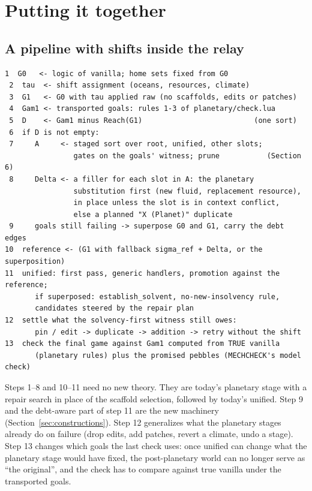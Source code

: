 \section{Putting it together}\label{sec:pipeline}

\subsection{A pipeline with shifts inside the relay}

\par\smallskip\noindent\begin{minipage}{\linewidth}
\begin{Verbatim}[fontsize=\small, frame=single, framesep=3mm]
 1  G0   <- logic of vanilla; home sets fixed from G0
 2  tau  <- shift assignment (oceans, resources, climate)
 3  G1   <- G0 with tau applied raw (no scaffolds, edits or patches)
 4  Gam1 <- transported goals: rules 1-3 of planetary/check.lua
 5  D    <- Gam1 minus Reach(G1)                          (one sort)
 6  if D is not empty:
 7     A     <- staged sort over root, unified, other slots;
                gates on the goals' witness; prune           (Section 6)
 8     Delta <- a filler for each slot in A: the planetary
                substitution first (new fluid, replacement resource),
                in place unless the slot is in context conflict,
                else a planned "X (Planet)" duplicate
 9     goals still failing -> superpose G0 and G1, carry the debt edges
10  reference <- (G1 with fallback sigma_ref + Delta, or the superposition)
11  unified: first pass, generic handlers, promotion against the reference;
       if superposed: establish_solvent, no-new-insolvency rule,
       candidates steered by the repair plan
12  settle what the solvency-first witness still owes:
       pin / edit -> duplicate -> addition -> retry without the shift
13  check the final game against Gam1 computed from TRUE vanilla
       (planetary rules) plus the promised pebbles (MECHCHECK's model check)
\end{Verbatim}
\end{minipage}\par\smallskip

Steps 1--8 and 10--11 need no new theory. They are today's planetary stage with a repair search in place of the scaffold selection, followed by today's unified. Step 9 and the debt-aware part of step 11 are the new machinery (Section~\ref{sec:constructions}). Step 12 generalizes what the planetary stages already do on failure (drop edits, add patches, revert a climate, undo a stage). Step 13 changes which goals the last check uses: once unified can change what the planetary stage would have fixed, the post-planetary world can no longer serve as ``the original'', and the check has to compare against true vanilla under the transported goals.

